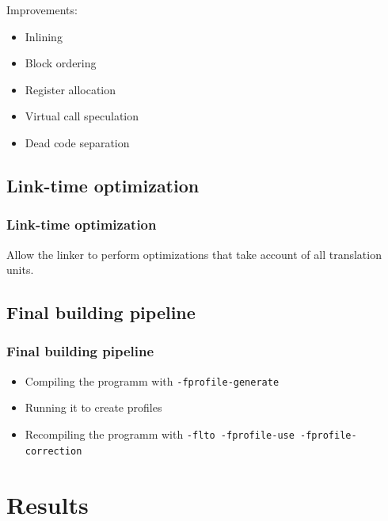 \documentclass{beamer}
\begin{document}
    \begin{frame}
        Improvements:
        \begin{itemize}
            \item Inlining
            \item Block ordering
            \item Register allocation
            \item Virtual call speculation
            \item Dead code separation
        \end{itemize}
    \end{frame}

    \subsection{Link-time optimization}

    \begin{frame}
        \frametitle{Link-time optimization}

        Allow the linker to perform optimizations that take account of all translation units.
    \end{frame}

    \subsection{Final building pipeline}

    \begin{frame}[fragile]
        \frametitle{Final building pipeline}

        \begin{itemize}
            \item Compiling the programm with \verb'-fprofile-generate'
            \item Running it to create profiles
            \item Recompiling the programm with \verb'-flto -fprofile-use -fprofile-correction'
        \end{itemize}
    \end{frame}

\section{Results}
\end{document}
